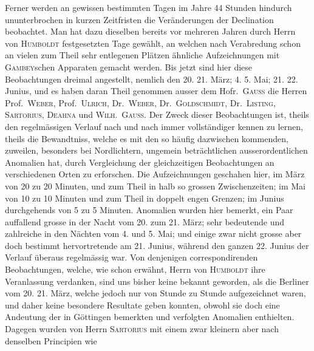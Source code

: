 Ferner werden an gewissen bestimmten Tagen im Jahre 44 Stunden hindurch ununterbrochen in kurzen Zeitfristen die Veränderungen der Declination beobachtet. Man hat dazu dieselben bereits vor mehreren Jahren durch Herrn von \textsc{Humboldt} festgesetzten Tage gewählt, an welchen nach Verabredung schon an vielen zum Theil sehr entlegenen Plätzen ähnliche Aufzeichnungen mit \textsc{Gambey}schen Apparaten gemacht werden. Bis jetzt sind hier diese Beobachtungen dreimal angestellt, nemlich den 20. 21. März; 4. 5. Mai; 21. 22. Junius, und es haben daran Theil genommen ausser dem Hofr.\ \textsc{Gauss} die Herren Prof.\ \textsc{Weber}, Prof.\ \textsc{Ulrich}, Dr.\ \textsc{Weber}, Dr.\ \textsc{Goldschmidt}, Dr.\ \textsc{Listing}, \textsc{Sartorius}, \textsc{Deahna} und \textsc{Wilh.\ Gauss}. Der Zweck dieser Beobachtungen ist, theils den regelmässigen Verlauf nach und nach immer vollständiger kennen zu lernen, theils die Bewandtniss, welche es mit den so häufig dazwischen kommenden, zuweilen, besonders bei Nordlichtern, ungemein beträchtlichen ausserordentlichen Anomalien hat, durch Vergleichung der gleichzeitigen Beobachtungen an verschiedenen Orten zu erforschen. Die Aufzeichnungen geschahen hier, im März von 20 zu 20 Minuten, und zum Theil in halb so grossen Zwischenzeiten; im Mai von 10 zu 10 Minuten und zum Theil in doppelt engen Grenzen; im Junius durchgehends von 5 zu 5 Minuten. Anomalien wurden hier bemerkt, ein Paar auffallend grosse in der Nacht vom 20. zum 21. März; sehr bedeutende und zahlreiche in den Nächten vom 4. und 5. Mai; und einige zwar nicht grosse aber doch bestimmt hervortretende am 21. Junius, während den ganzen 22. Junius der Verlauf überaus regelmässig war. Von denjenigen correspondirenden Beobachtungen, welche, wie schon erwähnt, Herrn von \textsc{Humboldt} ihre Veranlassung verdanken, sind uns bisher keine bekannt geworden, als die Berliner vom 20. 21. März, welche jedoch nur von Stunde zu Stunde aufgezeichnet waren, und daher keine besondere Resultate geben konnten, obwohl sie doch eine Andeutung der in Göttingen bemerkten und verfolgten Anomalien enthielten. Dagegen wurden von Herrn \textsc{Sartorius} mit einem zwar kleinern aber nach denselben Principien wie
\par\clearpage
{}
